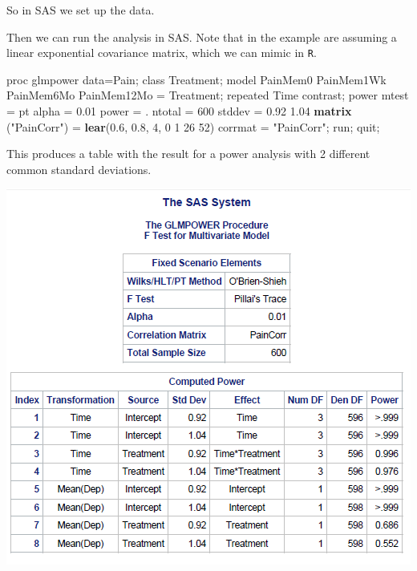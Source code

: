 \documentclass[
]{book}
\newenvironment{Shaded}{\begin{snugshade}}{\end{snugshade}}
\newcommand{\DecValTok}[1]{\textcolor[rgb]{0.00,0.00,0.81}{#1}}
\newcommand{\FloatTok}[1]{\textcolor[rgb]{0.00,0.00,0.81}{#1}}
\newcommand{\KeywordTok}[1]{\textcolor[rgb]{0.13,0.29,0.53}{\textbf{#1}}}
\newcommand{\NormalTok}[1]{#1}
\newcommand{\OperatorTok}[1]{\textcolor[rgb]{0.81,0.36,0.00}{\textbf{#1}}}
\newcommand{\StringTok}[1]{\textcolor[rgb]{0.31,0.60,0.02}{#1}}
\begin{document}
So in SAS we set up the data.

\begin{Shaded}
\end{Shaded}

Then we can run the analysis in SAS. Note that in the example \citet{SASglmpower} are assuming a linear exponential covariance matrix, which we can mimic in \texttt{R}.

\begin{Shaded}
\begin{Highlighting}[]
\NormalTok{proc glmpower data=Pain;}
\NormalTok{class Treatment;}
\NormalTok{model PainMem0 PainMem1Wk PainMem6Mo PainMem12Mo =}\StringTok{ }\NormalTok{Treatment;}
\NormalTok{repeated Time contrast;}
\NormalTok{power}
\NormalTok{mtest =}\StringTok{ }\NormalTok{pt }
\NormalTok{alpha =}\StringTok{ }\FloatTok{0.01}
\NormalTok{power =}\StringTok{ }\NormalTok{.}
\NormalTok{ntotal =}\StringTok{ }\DecValTok{600}
\NormalTok{stddev =}\StringTok{ }\FloatTok{0.92} \FloatTok{1.04}
\KeywordTok{matrix}\NormalTok{ (}\StringTok{"PainCorr"}\NormalTok{) =}\StringTok{ }\KeywordTok{lear}\NormalTok{(}\FloatTok{0.6}\NormalTok{, }\FloatTok{0.8}\NormalTok{, }\DecValTok{4}\NormalTok{, }\DecValTok{0} \DecValTok{1} \DecValTok{26} \DecValTok{52}\NormalTok{)}
\NormalTok{corrmat =}\StringTok{ "PainCorr"}\NormalTok{;}
\NormalTok{run;}
\NormalTok{quit;}
\end{Highlighting}
\end{Shaded}

This produces a table with the result for a power analysis with 2 different common standard deviations.

\includegraphics{screenshots/sas_pain.png}
\end{document}
